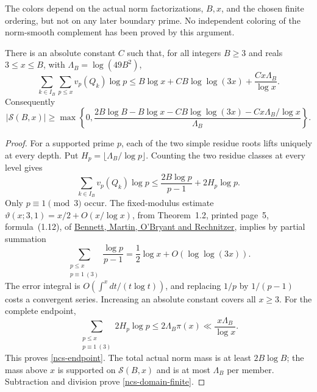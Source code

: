 The colors depend on the actual norm factorizations, \(B,x\),
and the chosen finite ordering, but not on any later boundary
prime. No independent coloring of the norm-smooth complement has
been proved by this argument.

\begin{theorem}
\label{ncs-small-mass}
There is an absolute constant \(C\) such that, for all integers
\(B\geq3\) and reals \(3\leq x\leq B\), with
\(\Lambda_B=\log(49B^2)\),
\begin{equation}\label{ncs-endpoint}
 \sum_{k\in I_B}\sum_{p\leq x}v_p(Q_k)\log p
 \leq B\log x+CB\log\log(3x)
                    +\frac{Cx\Lambda_B}{\log x}.
\end{equation}
Consequently
\begin{equation}\label{ncs-domain-finite}
 |\mathcal S(B,x)|\geq
 \max\left\{0,
 \frac{2B\log B-B\log x-CB\log\log(3x)-Cx\Lambda_B/\log x}
      {\Lambda_B}\right\}.
\end{equation}
\end{theorem}
\begin{proof}
For a supported prime \(p\), each of the two simple residue roots
lifts uniquely at every depth. Put
\(H_p=\lfloor\Lambda_B/\log p\rfloor\).
Counting the two residue classes at every level gives
\[
 \sum_{k\in I_B}v_p(Q_k)\log p
 \leq \frac{2B\log p}{p-1}+2H_p\log p.
\]
Only \(p\equiv1\pmod3\) occur. The fixed-modulus estimate
\(\vartheta(x;3,1)=x/2+O(x/\log x)\), from Theorem~1.2,
printed page~5, formula~(1.12), of
\href{https://arxiv.org/abs/1802.00085v3}
{Bennett, Martin, O'Bryant and Rechnitzer}, implies by partial
summation
\[
 \sum_{\substack{p\leq x\\p\equiv1\ (3)}}\frac{\log p}{p-1}
       =\frac12\log x+O(\log\log(3x)).
\]
The error integral is \(O(\int^x dt/(t\log t))\), and replacing
\(1/p\) by \(1/(p-1)\) costs a convergent series. Increasing an
absolute constant covers all \(x\geq3\). For the complete endpoint,
\[
 \sum_{\substack{p\leq x\\p\equiv1\ (3)}}2H_p\log p
 \leq2\Lambda_B\pi(x)\ll\frac{x\Lambda_B}{\log x}.
\]
This proves \eqref{ncs-endpoint}. The total actual norm mass is
at least \(2B\log B\); the mass above \(x\) is supported on
\(\mathcal S(B,x)\) and is at most \(\Lambda_B\) per member.
Subtraction and division prove \eqref{ncs-domain-finite}.
\end{proof}

